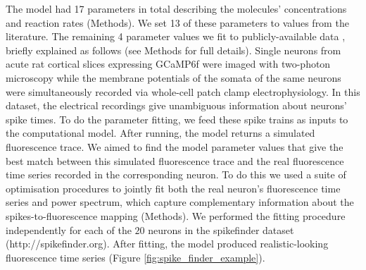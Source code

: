 The model had 17 parameters in total describing the molecules’ concentrations and reaction rates (Methods). We set 13 of these parameters to values from the literature. The remaining 4 parameter values we fit to publicly-available data  \parencite{berens}, briefly explained as follows (see Methods for full details).  Single neurons from acute rat cortical slices expressing GCaMP6f were imaged with two-photon microscopy while the membrane potentials of the somata of the same neurons were simultaneously recorded via whole-cell patch clamp electrophysiology. In this dataset, the electrical recordings give unambiguous information about neurons' spike times. To do the parameter fitting, we feed these spike trains as inputs to the computational model. After running, the model returns a simulated fluorescence trace. We aimed to find the model parameter values that give the best match between this simulated fluorescence trace and the real fluorescence time series recorded in the corresponding neuron. To do this we used a suite of optimisation procedures to jointly fit both the real neuron’s fluorescence time series and power spectrum, which capture complementary information about the spikes-to-fluorescence mapping (Methods). We performed the fitting procedure independently for each of the $20$ neurons in the spikefinder dataset (http://spikefinder.org). After fitting, the model produced realistic-looking fluorescence time series (Figure \ref{fig:spike_finder_example}).

